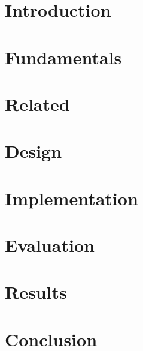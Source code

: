 \documentclass[
	12pt,
	a4paper,
	usegeometry,
	twoside,
	openright,
	toc=chapterentrywithdots
]{scrreprt}
\begin{document}
	
	

	\restoregeometry
	
	\tableofcontents
	\thispagestyle{empty}
	\newpage
	
	\chapter{Introduction}
	
	\chapter{Fundamentals}
	
	\chapter{Related}
	
	\chapter{Design}
	
	\chapter{Implementation}
	
	\chapter{Evaluation}
	
	\chapter{Results}
	
	\chapter{Conclusion}
\end{document}

